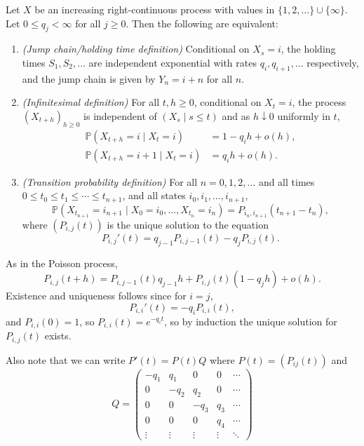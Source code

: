 \documentclass[12pt]{article}
\begin{document}
\begin{theorem}
	Let $X$ be an increasing right-continuous process with values in $\{1, 2, \ldots\} \cup \{\infty\}$. Let $0 \leq q_j < \infty$ for all $j \geq 0$. Then the following are equivalent:
	\begin{enumerate}[\normalfont(a)]
		\item \emph{(Jump chain/holding time definition)} Conditional on $X_s = i$, the holding times $S_1, S_2, \ldots$ are independent exponential with rates $q_i, q_{i+1}, \ldots$ respectively, and the jump chain is given by $Y_n = i+n$ for all $n$.
		\item \emph{(Infinitesimal definition)} For all $t, h \geq 0$, conditional on $X_t = i$, the process $(X_{t+h})_{h \geq 0}$ is independent of $(X_s \mid s \leq t)$ and as $h \downarrow 0$ uniformly in $t$,
			\begin{align*}
				\mathbb{P}(X_{t+h} = i \mid X_t = i) &= 1 - q_i h + o(h), \\
				\mathbb{P}(X_{t+h} = i+1 \mid X_t = i) &= q_i h + o(h).
			\end{align*}
		\item \emph{(Transition probability definition)} For all $n = 0, 1, 2, \ldots$ and all times $0 \leq t_0 \leq t_1 \leq \cdots \leq t_{n+1}$, and all states $i_0, i_1, \ldots, i_{n+1}$,
			\[
			\mathbb{P}(X_{t_{n+1}} = i_{n+1} \mid X_0 = i_0, \ldots, X_{t_n} = i_n) = P_{i_n, i_{n+1}} (t_{n+1} - t_n)
			,\]
			where $(P_{i,j}(t))$ is the unique solution to the equation
			\[
			P_{i,j}'(t) = q_{j-1}P_{i,j-1}(t) - q_jP_{i,j}(t)
			.\]
	\end{enumerate}
\end{theorem}

As in the Poisson process,
\[
P_{i,j}(t+h) = P_{i,j-1}(t) q_{j-1} h + P_{i,j}(t) (1 - q_j h) + o(h).
\]
Existence and uniqueness follows since for $i = j$,
\[
P_{i,i}'(t) = -q_i P_{i,i}(t)
,\]
and $P_{i,i}(0) = 1$, so $P_{i,i}(t) = e^{-q_i t}$, so by induction the unique solution for $P_{i,j}(t)$ exists.

Also note that we can write $P'(t) = P(t)Q$ where $P(t) = (P_{ij}(t))$ and
\[
Q =
\begin{pmatrix}
	-q_1 & q_1 & 0 & 0 & \cdots \\
	0 & -q_2 & q_2 & 0 & \cdots \\
	0 & 0 & -q_3 & q_3 & \cdots \\
	0 & 0 & 0 & q_4 & \cdots \\
	\vdots & \vdots & \vdots & \vdots & \ddots
\end{pmatrix}
\]
\end{document}
